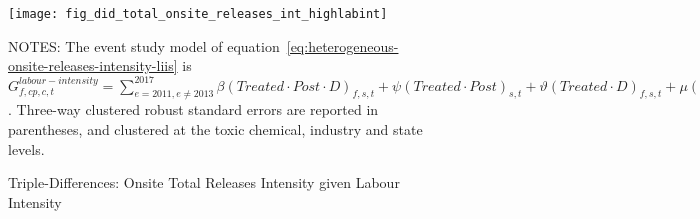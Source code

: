 \begin{figure}[H]
    \centering
    \texttt{[image: fig\_did\_total\_onsite\_releases\_int\_highlabint]}
    \caption{Triple-Differences: Onsite Total Releases Intensity given Labour Intensity}
    \label{fig:heterogeneous-onsite-releases-intensity-liis}
    \begin{minipage}{18cm}
        \vspace{0.05in}
        NOTES: The event study model of equation~\ref{eq:heterogeneous-onsite-releases-intensity-liis} is $G_{f,cp,c,t}^{labour-intensity} = \sum_{{e = 2011},{e \neq 2013}}^{2017} \beta (Treated \cdot Post \cdot D)_{f,s,t} + \psi (Treated \cdot Post)_{s,t} + \vartheta (Treated \cdot D)_{f,s,t} + \mu (Post \cdot D)_{f,s,t} + \tau Treated_{s,t} + \rho D_{f,s,t} + \alpha Post_{t} + \delta X_{v,c,t-1} + \omega F_{f,t} + \lambda_{t} + \gamma_{f} + \phi_{cp} + \zeta_{c} + \eta_{c,t} + \varepsilon_{f,cp,c,t}$. Three-way clustered robust standard errors are reported in parentheses, and clustered at the toxic chemical, industry and state levels.
    \end{minipage}
\end{figure}
